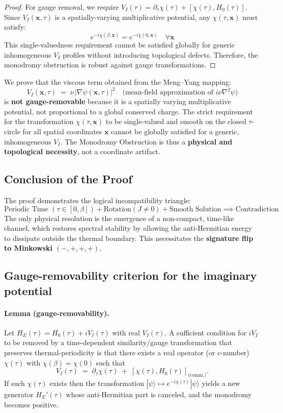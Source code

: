 \documentclass[11pt]{article}
\begin{document}
\begin{proof}
For gauge removal, we require $V_I(\tau) = \partial_\tau\chi(\tau) + [\chi(\tau), H_0(\tau)]$.
Since $V_I(\mathbf{x},\tau)$ is a spatially-varying multiplicative potential, any $\chi(\tau,\mathbf{x})$
must satisfy:
\begin{equation}
e^{-i\chi(\beta,\mathbf{x})} = e^{-i\chi(0,\mathbf{x})} \quad \forall \mathbf{x}
\end{equation}
This single-valuedness requirement cannot be satisfied globally for generic inhomogeneous
$V_I$ profiles without introducing topological defects. Therefore, the monodromy obstruction
is robust against gauge transformations.
\end{proof}

We prove that the viscous term obtained from the Meng--Yang mapping:
\[
        V_I(\mathbf x,\tau) \;=\; \nu\,|\nabla\psi(\mathbf x,\tau)|^2 \quad \text{(mean-field approximation of $i\nu\nabla^2\psi$)}
\]
is \textbf{not gauge-removable} because it is a spatially varying multiplicative potential, not proportional to a global conserved charge. The strict requirement for the transformation $\chi(\tau, \mathbf{x})$ to be single-valued and smooth on the closed $\tau$-circle for all spatial coordinates $\mathbf{x}$ cannot be globally satisfied for a generic, inhomogeneous $V_I$. The Monodromy Obstruction is thus a \textbf{physical and topological necessity}, not a coordinate artifact.

\subsection{Conclusion of the Proof}

The proof demonstrates the logical incompatibility triangle:
\[
    \text{Periodic Time } (\tau \in [0,\beta]) + \text{Rotation} (J \neq 0) + \text{Smooth Solution} \implies \text{Contradiction}
\]
The only physical resolution is the emergence of a non-compact, time-like channel, which restores spectral stability by allowing the anti-Hermitian energy to dissipate outside the thermal boundary. This necessitates the \textbf{signature flip to Minkowski $(-,+,+,+)$}.


\subsection*{Gauge-removability criterion for the imaginary potential}

\paragraph{Lemma (gauge-removability).}
Let \(H_E(\tau)=H_0(\tau)+iV_I(\tau)\) with real \(V_I(\tau)\). A sufficient condition for \(iV_I\) to be removed by a time-dependent similarity/gauge transformation that preserves thermal-periodicity is that there exists a real operator (or c-number) \(\chi(\tau)\) with \(\chi(\beta)=\chi(0)\) such that
\[
V_I(\tau) \;=\; \partial_\tau\chi(\tau) \;+\; [\chi(\tau),H_0(\tau)]_{\text{(comm.)}}.
\]
If such \(\chi(\tau)\) exists then the transformation \(|\psi\rangle\mapsto e^{-i\chi(\tau)}|\psi\rangle\) yields a new generator \(H_E'(\tau)\) whose anti-Hermitian part is canceled, and the monodromy becomes positive.
\end{document}

